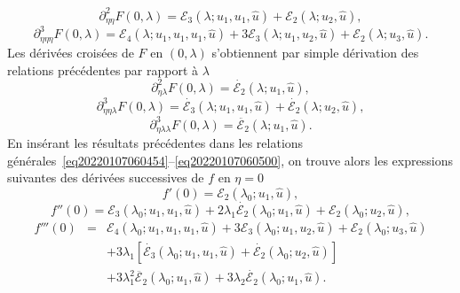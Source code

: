 \documentclass{article}
\newcommand{\nocomma}{}
\newcommand{\nosymbol}{}
\begin{document}
\begin{equation}
  \partial_{\eta \nocomma \eta}^2 F (0, \lambda) =\mathcal{E}_3 (\lambda ;
  u_1, u_1, \hat{u}) +\mathcal{E}_2 (\lambda ; u_2, \hat{u}),
\end{equation}
\begin{equation}
  \partial_{\eta \nocomma \eta \nocomma \eta}^3 F (0, \lambda) =\mathcal{E}_4
  (\lambda ; u_1, u_1, u_1, \hat{u}) + 3\mathcal{E}_3 (\lambda ; u_1, u_2,
  \hat{u}) +\mathcal{E}_2 (\lambda ; u_3, \hat{u}) .
\end{equation}
Les d{\'e}riv{\'e}es crois{\'e}es de $F$ en $(0, \lambda)$ s'obtiennent par
simple d{\'e}rivation des relations pr{\'e}c{\'e}dentes par rapport {\`a}
$\lambda$
\begin{equation}
  \partial_{\eta \nocomma \lambda}^2 F (0, \lambda) = \dot{\mathcal{E}_2}
  (\lambda ; u_1, \hat{u}),
\end{equation}
\begin{equation}
  \partial_{\eta \nocomma \eta \nocomma \lambda}^3 F (0, \lambda) =
  \dot{\mathcal{E}_3} (\lambda ; u_1, u_1, \hat{u}) + \dot{\mathcal{E}_2}
  (\lambda ; u_2, \hat{u}),
\end{equation}
\begin{equation}
  \partial_{\eta \nocomma \lambda \nocomma \lambda}^3 F (0, \lambda) =
  \ddot{\mathcal{E}_2} (\lambda ; u_1, \hat{u}) .
\end{equation}
En ins{\'e}rant les r{\'e}sultats pr{\'e}c{\'e}dentes dans les relations
g{\'e}n{\'e}rales~\eqref{eq20220107060454}--\eqref{eq20220107060500}, on
trouve alors les expressions suivantes des d{\'e}riv{\'e}es successives de $f$
en $\eta = 0$
\begin{equation}
  f' (0) =\mathcal{E}_2 (\lambda_0 ; u_1, \hat{u}),
\end{equation}
\begin{equation}
  f'' (0) =\mathcal{E}_3 (\lambda_0 ; u_1, u_1, \hat{u}) + 2 \lambda_1
  \dot{\mathcal{E}_2} (\lambda_0 ; u_1, \hat{u}) +\mathcal{E}_2 (\lambda_0 ;
  u_2, \hat{u}),
\end{equation}
\begin{eqnarray}
  f''' (0) & = & \mathcal{E}_4 (\lambda_0 ; u_1, u_1, u_1, \hat{u}) +
  3\mathcal{E}_3 (\lambda_0 ; u_1, u_2, \hat{u}) +\mathcal{E}_2 (\lambda_0 ;
  u_3, \hat{u}) \nonumber\\
  &  & \nosymbol + 3 \lambda_1  [\dot{\mathcal{E}_3} (\lambda_0 ; u_1, u_1,
  \hat{u}) + \dot{\mathcal{E}_2} (\lambda_0 ; u_2, \hat{u})] \nonumber\\
  &  & \nosymbol + 3 \lambda_1^2  \ddot{\mathcal{E}_2} (\lambda_0 ; u_1,
  \hat{u}) + 3 \lambda_2  \dot{\mathcal{E}_2} (\lambda_0 ; u_1, \hat{u}) .
\end{eqnarray}
\end{document}
